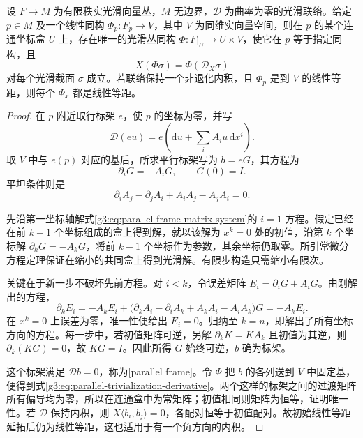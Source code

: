 \begin{lemma}\label{g3:lem:flat-connection-local-frame}
	设 \(F\to M\) 为有限秩实光滑向量丛，\(M\) 无边界，\(\mathscr D\) 为曲率为零的光滑联络。给定 \(p\in M\) 及一个线性同构 \(\Phi_p:F_p\to V\)，其中 \(V\) 为同维实向量空间，则在 \(p\) 的某个连通坐标盒 \(U\) 上，存在唯一的光滑丛同构 \(\Phi:F|_U\to U\times V\)，使它在 \(p\) 等于指定同构，且
	\begin{equation}\label{g3:eq:parallel-trivialization-derivative}
		X(\Phi\sigma)=\Phi(\mathscr D_X\sigma)
	\end{equation}
	对每个光滑截面 \(\sigma\) 成立。若联络保持一个非退化内积，且 \(\Phi_p\) 是到 \(V\) 的线性等距，则每个 \(\Phi_x\) 都是线性等距。
\end{lemma}
\begin{proof}
	在 \(p\) 附近取行标架 \(e\)，使 \(p\) 的坐标为零，并写
	\[
		\mathscr D(eu)=e\left(\mathrm du+\sum_i A_i u\,\mathrm dx^i\right).
	\]
	取 \(V\) 中与 \(e(p)\) 对应的基后，所求平行标架写为 \(b=eG\)，其方程为
	\begin{equation}\label{g3:eq:parallel-frame-matrix-system}
		\partial_iG=-A_iG,\qquad G(0)=I.
	\end{equation}
	平坦条件则是
	\[
		\partial_iA_j-\partial_jA_i+A_iA_j-A_jA_i=0.
	\]

	先沿第一坐标轴解式\eqref{g3:eq:parallel-frame-matrix-system}的 \(i=1\) 方程。假定已经在前 \(k-1\) 个坐标组成的盒上得到解，就以该解为 \(x^k=0\) 处的初值，沿第 \(k\) 个坐标解 \(\partial_kG=-A_kG\)，将前 \(k-1\) 个坐标作为参数，其余坐标仍取零。所引常微分方程定理保证在缩小的共同盒上得到光滑解。有限步构造只需缩小有限次。

	关键在于新一步不破坏先前方程。对 \(i<k\)，令误差矩阵 \(E_i=\partial_iG+A_iG\)。由刚解出的方程，
	\[
		\partial_kE_i
		=-A_kE_i+
		\bigl(\partial_kA_i-\partial_iA_k+A_kA_i-A_iA_k\bigr)G
		=-A_kE_i.
	\]
	在 \(x^k=0\) 上误差为零，唯一性便给出 \(E_i=0\)。归纳至 \(k=n\)，即解出了所有坐标方向的方程。每一步中，若初值矩阵可逆，另解 \(\partial_kK=KA_k\) 且初值为其逆，则 \(\partial_k(KG)=0\)，故 \(KG=I\)。因此所得 \(G\) 始终可逆，\(b\) 确为标架。

	这个标架满足 \(\mathscr Db=0\)，称为[parallel frame]。令 \(\Phi\) 把 \(b\) 的各列送到 \(V\) 中固定基，便得到式\eqref{g3:eq:parallel-trivialization-derivative}。两个这样的标架之间的过渡矩阵所有偏导均为零，所以在连通盒中为常矩阵；初值相同则矩阵为恒等，证明唯一性。若 \(\mathscr D\) 保持内积，则 \(X\langle b_i,b_j\rangle=0\)，各配对恒等于初值配对。故初始线性等距延拓后仍为线性等距，这也适用于有一个负方向的内积。
\end{proof}

